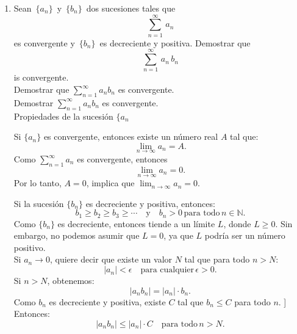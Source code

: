 \documentclass{article}
\begin{document}
\begin{enumerate}
Se comporta como una serie $p$ con $p=1$, lo que implica que \textbf{diverge} para cualquier valor de x .

.

\textbf{Ejercicio 4}

$$
\begin{aligned}
& \sum_{n=1}^{\infty} \frac{1}{n} \operatorname{sen}^2 n x \\
& a_n=\frac{\operatorname{sen}^2(n x)}{n}
\end{aligned}
$$

La función $\operatorname{sen}^2(n x)$ está acotada entre 0 y 1 para cualquier n y x . Esto implica que $\operatorname{sen}^2(n x)$ oscila con n , dependiendo del valor de x .
$$
\sum_{n=1}^{\infty} \frac{1}{n}
$$

Es una serie $\mathbf{p}$ con $\mathrm{p}=1$, y se sabe que diverge.

El termino $\frac{\operatorname{sen}^2(n x)}{n}$ tiene un comportamiento similar a $\frac{1}{n}$ ya que el numerador $\operatorname{sen}^2(n x)$ está acotado, pero no tiende a cero rápidamente $\frac{1}{n}$. Por lo tanto, la serie:
$$
\sum_{n=1}^{\infty} \frac{1}{n} \operatorname{sen}^2 n x
$$
\textbf{Diverge para cualquier valor de $\mathbf{x}$} debido a que su término general no decrece lo suficientemente rápido para garantizar la convergencia.

\newpage

\item Sean \,$\{a_n\}$\, y \,$\{b_n\}$\, dos sucesiones tales que \[\sum_{n=1}^{\infty}\, a_n \] es convergente y \,$\{b_n\}$\, es decreciente y positiva. Demostrar que\[\sum_{n=1}^{\infty}\, a_n\,b_n \] is convergente.
\\
Demostrar que \( \sum_{n=1}^{\infty} a_n b_n \) es convergente.\\

Demostrar \( \sum_{n=1}^{\infty} a_n b_n \) es convergente.\\

Propiedades de la sucesión \( \{a_n\)

Si \( \{a_n\} \) es convergente, entonces existe un número real \( A \) tal que:
\[
\lim_{n \to \infty} a_n = A.
\]
Como \( \sum_{n=1}^{\infty} a_n \) es convergente, entonces
\[
\lim_{n \to \infty} a_n = 0.
\]
Por lo tanto, \( A = 0 \), implica que \( \lim_{n \to \infty} a_n = 0 \).

Si la sucesión \( \{b_n\} \) es decreciente y positiva, entonces:
\[
b_1 \geq b_2 \geq b_3 \geq \cdots \quad \text{y} \quad b_n > 0 \, \text{para todo} \, n \in \mathbb{N}.
\]
Como \( \{b_n\} \) es decreciente, entonces tiende a un límite \( L \), donde \( L \geq 0 \). Sin embargo, no podemos asumir que \( L = 0 \), ya que \( L \) podría ser un número positivo.
\\
Si  \( a_n \to 0 \), quiere decir que existe un valor \( N \) tal que para todo \( n > N \):
\[
|a_n| < \epsilon \quad \text{para cualquier} \, \epsilon > 0.
\]
Si \( n > N \), obtenemos:
\[
|a_n b_n| = |a_n| \cdot b_n.
\]
Como \( b_n \) es decreciente y positiva, existe  \( C \) tal que \( b_n \leq C \) para todo \( n \). ]
Entonces:\[ |a_n b_n| \leq |a_n| \cdot C \quad \text{para todo} \, n > N.\]


\end{enumerate}
\end{document}
